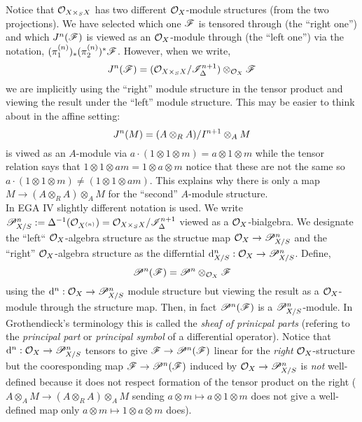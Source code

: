\documentclass[12pt]{article}
\begin{document}
\begin{rmk}
Notice that $\mathcal{O}_{X \times_S X}$ has two different $\mathcal{O}_{X}$-module structures (from the two projections). We have selected which one $\mathscr{F}$ is tensored through (the ``right one'') and which $J^n(\mathscr{F})$ is viewed as an $\mathcal{O}_{X}$-module through (the ``left one'') via the notation, $(\pi_1^{(n)})_* (\pi_2^{(n)})^* \mathscr{F}$. However, when we write,
\[ J^n(\mathscr{F}) = (\mathcal{O}_{X \times_S X} / \mathscr{I}_\Delta^{n+1}) \otimes_{\mathcal{O}_{X}} \mathscr{F} \]
we are implicitly using the ``right'' module structure in the tensor product and viewing the result under the ``left'' module structure. This may be easier to think about in the affine setting:
\[ J^n(M) = (A \otimes_R A)/I^{n+1} \otimes_A M \]
is viwed as an $A$-module via $a \cdot (1 \otimes 1 \otimes m) = a \otimes 1 \otimes m$ while the tensor relation says that $1 \otimes 1 \otimes a m = 1 \otimes a \otimes m$ notice that these are not the same so $a \cdot (1 \otimes 1 \otimes m) \neq (1 \otimes 1 \otimes am)$. This explains why there is only a map $M \to (A \otimes_R A) \otimes_A M$ for the ``second'' $A$-module structure.
\bigskip\\
In EGA IV slightly different notation is used. We write $\mathscr{P}^n_{X/S} := \Delta^{-1}(\mathcal{O}_{X^{(n)}}) = \mathcal{O}_{X \times_S X} / \mathscr{I}^{n+1}_\Delta$ viewed as a $\mathcal{O}_{X}$-bialgebra. We designate the ``left`` $\mathcal{O}_{X}$-algebra structure as the structue map $\mathcal{O}_{X} \to \mathscr{P}^n_{X/S}$ and the ``right'' $\mathcal{O}_{X}$-algebra structure as the differntial $\mathrm{d}^n_{X/S} : \mathcal{O}_{X} \to \mathscr{P}^n_{X/S}$. Define,
\[ \mathscr{P}^n(\mathscr{F}) = \mathscr{P}^n \otimes_{\mathcal{O}_{X}} \mathscr{F} \]
using the $\mathrm{d}^n : \mathcal{O}_{X} \to \mathscr{P}^n_{X/S}$ module structure but viewing the result as a $\mathcal{O}_{X}$-module through the structure map. Then, in fact $\mathscr{P}^n(\mathscr{F})$ is a $\mathscr{P}^n_{X/S}$-module. In Grothendieck's terminology this is called the \textit{sheaf of prinicpal parts} (refering to the \textit{principal part} or \textit{principal symbol} of a differential operator). Notice that $\mathrm{d}^n : \mathcal{O}_{X} \to \mathscr{P}^n_{X/S}$ tensors to give $\mathscr{F} \to \mathscr{P}^n(\mathscr{F})$ linear for the \textit{right} $\mathcal{O}_{X}$-structure but the cooresponding map $\mathscr{F} \to \mathscr{P}^n(\mathscr{F})$ induced by $\mathcal{O}_{X} \to \mathscr{P}^n_{X/S}$ is \textit{not} well-defined because it does not respect formation of the tensor product on the right ($A \otimes_A M \to (A \otimes_R A) \otimes_A M$ sending $a \otimes m \mapsto a \otimes 1 \otimes m$ does not give a well-defined map only $a \otimes m \mapsto 1 \otimes a \otimes m$ does).
\end{rmk}
\end{document}
